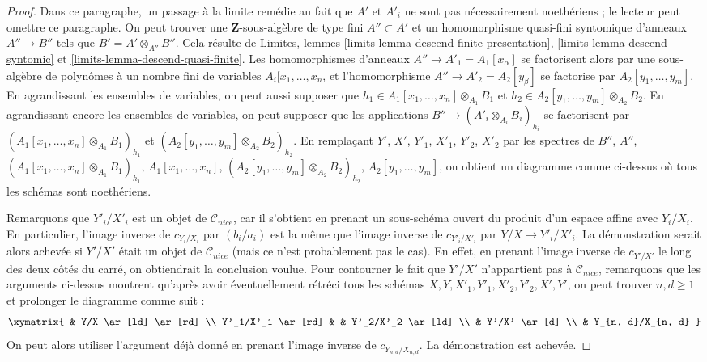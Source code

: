 \begin{proof}
\medskip\noindent
Dans ce paragraphe, un passage à la limite remédie au fait que $A'$ et $A'_i$ ne sont pas
nécessairement noethériens ; le lecteur peut omettre ce paragraphe.
On peut trouver une $\mathbf{Z}$-sous-algèbre de type fini
$A'' \subset A'$ et un homomorphisme quasi-fini syntomique d'anneaux
$A'' \to B''$ tels que $B' = A' \otimes_{A''} B''$.
Cela résulte de Limites, lemmes
\ref{limits-lemma-descend-finite-presentation},
\ref{limits-lemma-descend-syntomic} et
\ref{limits-lemma-descend-quasi-finite}.
Les homomorphismes d'anneaux $A'' \to A'_1 = A_1[x_\alpha]$ se factorisent alors par une
sous-algèbre de polynômes à un nombre fini de variables $A_i[x_1, \ldots, x_n$, et l'homomorphisme
$A'' \to A'_2 = A_2[y_\beta]$ se factorise par $A_2[y_1, \ldots, y_m]$.
En agrandissant les ensembles de variables, on peut aussi supposer que
$h_1 \in A_1[x_1, \ldots, x_n] \otimes_{A_1} B_1$ et
$h_2 \in A_2[y_1, \ldots, y_m] \otimes_{A_2} B_2$.
En agrandissant encore les ensembles de variables, on peut supposer
que les applications $B'' \to (A'_i \otimes_{A_i} B_i)_{h_i}$
se factorisent par $(A_1[x_1, \ldots, x_n] \otimes_{A_1} B_1)_{h_1}$
et $(A_2[y_1, \ldots, y_m] \otimes_{A_2} B_2)_{h_2}$.
En remplaçant $Y'$, $X'$, $Y'_1$, $X'_1$, $Y'_2$, $X'_2$ par les spectres de
$B''$, $A''$, $(A_1[x_1, \ldots, x_n] \otimes_{A_1} B_1)_{h_1}$,
$A_1[x_1, \ldots, x_n]$, $(A_2[y_1, \ldots, y_m] \otimes_{A_2} B_2)_{h_2}$,
$A_2[y_1, \ldots, y_m]$, on obtient un diagramme comme ci-dessus
où tous les schémas sont noethériens.

\medskip\noindent
Remarquons que $Y'_i/X'_i$ est un objet de $\mathcal{C}_{nice}$, car il
s'obtient en prenant un sous-schéma ouvert du produit d'un espace affine
avec $Y_i/X_i$. En particulier, l'image inverse de
$c_{Y_i/X_i}$ par $(b_i/a_i)$ est la même que l'image inverse de
$c_{Y'_i/X'_i}$ par $Y/X \to Y'_i/X'_i$.
La démonstration serait alors achevée si $Y'/X'$ était un objet de $\mathcal{C}_{nice}$
(mais ce n'est probablement pas le cas). En effet, en prenant l'image inverse de $c_{Y'/X'}$
le long des deux côtés du carré, on obtiendrait la conclusion voulue.
Pour contourner le fait que $Y'/X'$ n'appartient pas à $\mathcal{C}_{nice}$,
remarquons que les arguments ci-dessus montrent qu'après avoir éventuellement rétréci tous
les schémas $X, Y, X'_1, Y'_1, X'_2, Y'_2, X', Y'$, on peut trouver
$n, d \geq 1$ et prolonger le diagramme comme suit :
$$
\xymatrix{
& Y/X \ar[ld] \ar[rd] \\
Y'_1/X'_1 \ar[rd] & & Y'_2/X'_2 \ar[ld] \\
& Y'/X' \ar[d] \\
& Y_{n, d}/X_{n, d}
}
$$
On peut alors utiliser l'argument déjà donné en prenant
l'image inverse de $c_{Y_{n, d}/X_{n, d}}$. La démonstration est achevée.
\end{proof}













